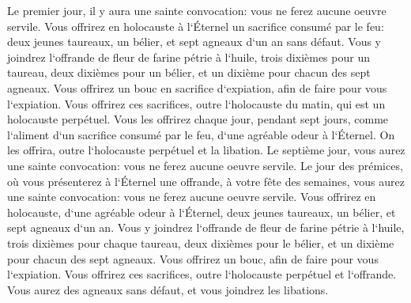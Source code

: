 \verse Le premier jour, il y aura une sainte convocation: vous ne ferez aucune oeuvre servile. 
\verse Vous offrirez en holocauste à l`Éternel un sacrifice consumé par le feu: deux jeunes taureaux, un bélier, et sept agneaux d`un an sans défaut. 
\verse Vous y joindrez l`offrande de fleur de farine pétrie à l`huile, trois dixièmes pour un taureau, deux dixièmes pour un bélier, 
\verse et un dixième pour chacun des sept agneaux. 
\verse Vous offrirez un bouc en sacrifice d`expiation, afin de faire pour vous l`expiation. 
\verse Vous offrirez ces sacrifices, outre l`holocauste du matin, qui est un holocauste perpétuel. 
\verse Vous les offrirez chaque jour, pendant sept jours, comme l`aliment d`un sacrifice consumé par le feu, d`une agréable odeur à l`Éternel. On les offrira, outre l`holocauste perpétuel et la libation. 
\verse Le septième jour, vous aurez une sainte convocation: vous ne ferez aucune oeuvre servile. 
\verse Le jour des prémices, où vous présenterez à l`Éternel une offrande, à votre fête des semaines, vous aurez une sainte convocation: vous ne ferez aucune oeuvre servile. 
\verse Vous offrirez en holocauste, d`une agréable odeur à l`Éternel, deux jeunes taureaux, un bélier, et sept agneaux d`un an. 
\verse Vous y joindrez l`offrande de fleur de farine pétrie à l`huile, trois dixièmes pour chaque taureau, deux dixièmes pour le bélier, 
\verse et un dixième pour chacun des sept agneaux. 
\verse Vous offrirez un bouc, afin de faire pour vous l`expiation. 
\verse Vous offrirez ces sacrifices, outre l`holocauste perpétuel et l`offrande. Vous aurez des agneaux sans défaut, et vous joindrez les libations. 

